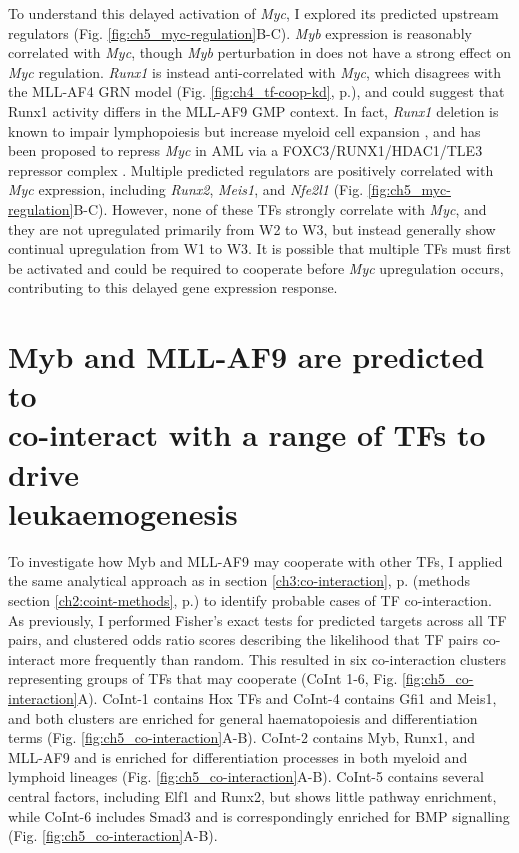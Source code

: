To understand this delayed activation of \textit{Myc}, I explored its predicted upstream regulators (Fig. \ref{fig:ch5_myc-regulation}B-C). \textit{Myb} expression is reasonably correlated with \textit{Myc}, though \textit{Myb} perturbation in \mybmre{} does not have a strong effect on \textit{Myc} regulation. \textit{Runx1} is instead anti-correlated with \textit{Myc}, which disagrees with the MLL-AF4 GRN model (Fig. \ref{fig:ch4_tf-coop-kd}, p.\pageref{fig:ch4_tf-coop-kd}), and could suggest that Runx1 activity differs in the MLL-AF9 GMP context. In fact, \textit{Runx1} deletion is known to impair lymphopoiesis but increase myeloid cell expansion \citep{growney_loss_2005, ichikawa_aml-1_2004}, and has been proposed to repress \textit{Myc} in AML via a FOXC3/RUNX1/HDAC1/TLE3 repressor complex \citep{simeoni_enhancer_2021}. Multiple predicted regulators are positively correlated with \textit{Myc} expression, including \textit{Runx2}, \textit{Meis1}, and \textit{Nfe2l1} (Fig. \ref{fig:ch5_myc-regulation}B-C). However, none of these TFs strongly correlate with \textit{Myc}, and they are not upregulated primarily from W2 to W3, but instead generally show continual upregulation from W1 to W3. It is possible that multiple TFs must first be activated and could be required to cooperate before \textit{Myc} upregulation occurs, contributing to this delayed gene expression response.

\section[Myb and MLL-AF9 are predicted to co-interact with a range of TFs to drive leukaemogenesis]{\label{ch5:co-interact}Myb and MLL-AF9 are predicted to\\co-interact with a range of TFs to drive\\leukaemogenesis}

To investigate how Myb and MLL-AF9 may cooperate with other TFs, I applied the same analytical approach as in section \ref{ch3:co-interaction}, p.\pageref{ch3:co-interaction} (methods section \ref{ch2:coint-methods}, p.\pageref{ch2:coint-methods}) to identify probable cases of TF co-interaction. As previously, I performed Fisher's exact tests for predicted targets across all TF pairs, and clustered odds ratio scores describing the likelihood that TF pairs co-interact more frequently than random. This resulted in six co-interaction clusters representing groups of TFs that may cooperate (CoInt 1-6, Fig. \ref{fig:ch5_co-interaction}A). CoInt-1 contains Hox TFs and CoInt-4 contains Gfi1 and Meis1, and both clusters are enriched for general haematopoiesis and differentiation terms (Fig. \ref{fig:ch5_co-interaction}A-B). CoInt-2 contains Myb, Runx1, and MLL-AF9 and is enriched for differentiation processes in both myeloid and lymphoid lineages (Fig. \ref{fig:ch5_co-interaction}A-B). CoInt-5 contains several central factors, including Elf1 and Runx2, but shows little pathway enrichment, while CoInt-6 includes Smad3 and is correspondingly enriched for BMP signalling (Fig. \ref{fig:ch5_co-interaction}A-B).


